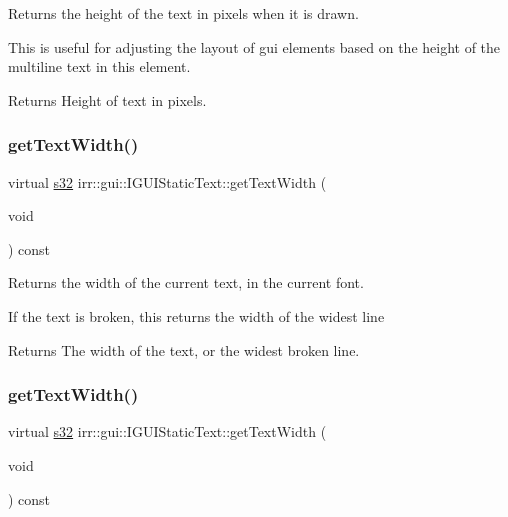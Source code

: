Returns the height of the text in pixels when it is drawn. 

This is useful for adjusting the layout of gui elements based on the height of the multiline text in this element. \begin{DoxyReturn}{Returns}
Height of text in pixels. 
\end{DoxyReturn}
\mbox{\label{classirr_1_1gui_1_1IGUIStaticText_adcfbe869b6c0ab409bbde51d4cba7e5d}} 
\subsubsection{\texorpdfstring{get\+Text\+Width()}{getTextWidth()}\hspace{0.1cm}{\footnotesize\ttfamily [1/2]}}
{\footnotesize\ttfamily virtual \hyperlink{namespaceirr_ac66849b7a6ed16e30ebede579f9b47c6}{s32} irr\+::gui\+::\+I\+G\+U\+I\+Static\+Text\+::get\+Text\+Width (\begin{DoxyParamCaption}\item[{void}]{ }\end{DoxyParamCaption}) const\hspace{0.3cm}{\ttfamily [pure virtual]}}



Returns the width of the current text, in the current font. 

If the text is broken, this returns the width of the widest line \begin{DoxyReturn}{Returns}
The width of the text, or the widest broken line. 
\end{DoxyReturn}
\mbox{\label{classirr_1_1gui_1_1IGUIStaticText_adcfbe869b6c0ab409bbde51d4cba7e5d}} 
\subsubsection{\texorpdfstring{get\+Text\+Width()}{getTextWidth()}\hspace{0.1cm}{\footnotesize\ttfamily [2/2]}}
{\footnotesize\ttfamily virtual \hyperlink{namespaceirr_ac66849b7a6ed16e30ebede579f9b47c6}{s32} irr\+::gui\+::\+I\+G\+U\+I\+Static\+Text\+::get\+Text\+Width (\begin{DoxyParamCaption}\item[{void}]{ }\end{DoxyParamCaption}) const\hspace{0.3cm}{\ttfamily [pure virtual]}}



